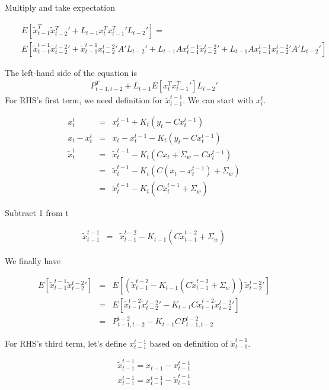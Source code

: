\documentclass[12pt]{report}
\begin{document}
Multiply and take expectation

\begin{eqnarray*}
&& E[ \tilde{x}_{t-1}^T \tilde{x}{_{t-2}^T}' + L_{t-1}x_t^Tx{_{t-1}^T}'L_{t-2}' ] = \\
&& E[ 
  \tilde{x}_{t-1}^{t-1}\tilde{x}{_{t-2}^{t-2}}' + 
  \tilde{x}_{t-1}^{t-1}x{_{t-2}^{t-2}}'A'L_{t-2}' +
  L_{t-1}Ax_{t-1}^{t-1}\tilde{x}{_{t-2}^{t-2}}' +
  L_{t-1}Ax_{t-1}^{t-1}x{_{t-2}^{t-2}}'A'L_{t-2}'
  ]
\end{eqnarray*}

The left-hand side of the equation is
\begin{eqnarray*}
P_{t-1,t-2}^T + L_{t-1}E[x_t^Tx{_{t-1}^T}']L_{t-2}'
\end{eqnarray*}
For RHS's first term, we need definition for $\tilde{x}_{t-1}^{t-1}$. We can
start with $x_t^t$.

\begin{eqnarray*}
x_t^t &=& x_t^{t-1} + K_t(y_t - Cx_t^{t-1})\\
x_t - x_t^t &=& x_t - x_t^{t-1} - K_t(y_t - Cx_t^{t-1})\\
\tilde{x}_t^t  &=& \tilde{x}_t^{t-1} - K_t(Cx_t + \Sigma_w - Cx_t^{t-1})\\
&=& \tilde{x}_t^{t-1} - K_t(C(x_t-x_t^{t-1}) + \Sigma_w)\\
&=& \tilde{x}_t^{t-1} - K_t(C\tilde{x}_t^{t-1} + \Sigma_w)
\end{eqnarray*}

Subtract 1 from t

\begin{eqnarray*}
\tilde{x}_{t-1}^{t-1} &=& \tilde{x}_{t-1}^{t-2} - K_{t-1}(C\tilde{x}_{t-1}^{t-2} + \Sigma_w)
\end{eqnarray*}

We finally have

\begin{eqnarray*}
E[\tilde{x}_{t-1}^{t-1}\tilde{x}{_{t-2}^{t-2}}'] &=&
E[ (\tilde{x}_{t-1}^{t-2} - K_{t-1}(C\tilde{x}_{t-1}^{t-2} + \Sigma_w ))
  \tilde{x}{_{t-2}^{t-2}}'] \\
&=& 
E[ \tilde{x}_{t-1}^{t-2}\tilde{x}{_{t-2}^{t-2}}' - 
  K_{t-1}C\tilde{x}_{t-1}^{t-2}\tilde{x}{_{t-2}^{t-2}}'
]\\
&=& P_{t-1,t-2}^{t-2} - K_{t-1} C P_{t-1,t-2}^{t-2}
\end{eqnarray*}

For RHS's third term, let's define $x_{t-1}^{t-1}$ based on definition of
$\tilde{x}_{t-1}^{t-1}$. 

\begin{eqnarray*}
\tilde{x}_{t-1}^{t-1} = x_{t-1} - x_{t-1}^{t-1}\\
x_{t-1}^{t-1} = x_{t-1}^{t-1} - \tilde{x}_{t-1}^{t-1} 
\end{eqnarray*}
\end{document}

